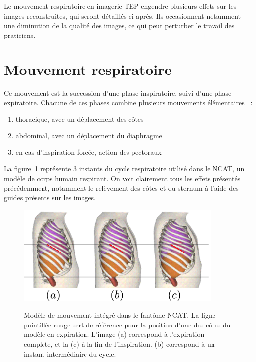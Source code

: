 Le mouvement respiratoire en imagerie TEP engendre plusieurs effets sur les images reconstruites, qui seront détaillés ci-après. Ils occasionnent notamment une diminution de la qualité des images, ce qui peut perturber le travail des praticiens.

\section{Mouvement respiratoire}

Ce mouvement est la succession d'une phase inspiratoire, suivi d'une phase expiratoire. Chacune de ces phases combine plusieurs mouvements élémentaires~\cite{servant2007cours} :
 
\begin{enumerate}
 \item thoracique, avec un déplacement des côtes
 \item abdominal, avec un déplacement du diaphragme
 \item en cas d'inspiration forcée, action des pectoraux
\end{enumerate}

La figure~\ref{fig:respiXCAT} représente 3 instants du cycle respiratoire utilisé dans le NCAT, un modèle de corps humain respirant. On voit clairement tous les effets présentés précédemment, notamment le relèvement des côtes et du sternum à l’aide des guides présents sur les images.

\begin{figure}[h!]
    \begin{center}
            \includegraphics[width=10cm]{images/mvtRespi} \\
    \end{center}
    \caption[Modèle de mouvement intégré dans le fantôme NCAT]{Modèle de mouvement intégré dans le fantôme NCAT. La ligne pointillée rouge sert de référence pour la position d'une des côtes du modèle en expiration. L'image (a) correspond à l'expiration complète, et la (c) à la fin de l'inspiration. (b) correspond à un instant intermédiaire du cycle. }
    \label{fig:respiXCAT}
\end{figure}


